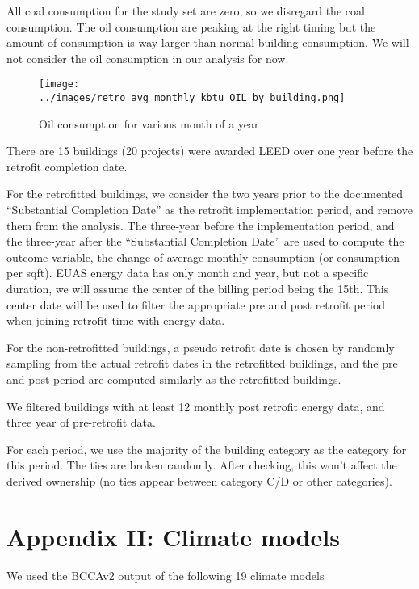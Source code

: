 \documentclass[12pt]{article}
\begin{document}
All coal consumption for the study set are zero, so we disregard the coal
consumption. The oil consumption are peaking at the right timing but the amount
of consumption is way larger than normal building consumption. We will not
consider the oil consumption in our analysis for now.

\begin{figure}[H]
  \centering
  \texttt{[image: ../images/retro\_avg\_monthly\_kbtu\_OIL\_by\_building.png]}
  \caption[Oil consumption trend]{Oil consumption for various month of a year}
  \label{fig:retro_avg_monthly_kbtu_OIL_by_building}
\end{figure}

There are 15 buildings (20 projects) were awarded LEED over one year before the
retrofit completion date.

For the retrofitted buildings, we consider the two years prior to the documented
``Substantial Completion Date'' as the retrofit implementation period, and
remove them from the analysis. The three-year before the implementation period,
and the three-year after the ``Substantial Completion Date'' are used to compute
the outcome variable, the change of average monthly consumption (or consumption
per sqft). EUAS energy data has only month and year, but not a specific
duration, we will assume the center of the billing period being the 15th. This
center date will be used to filter the appropriate pre and post retrofit period
when joining retrofit time with energy data.

For the non-retrofitted buildings, a pseudo retrofit date is chosen by randomly
sampling from the actual retrofit dates in the retrofitted buildings, and the pre
and post period are computed similarly as the retrofitted buildings.

We filtered buildings with at least 12 monthly post retrofit energy data, and
three year of pre-retrofit data.

For each period, we use the majority of the building category as the category
for this period. The ties are broken randomly. After checking, this won't affect
the derived ownership (no ties appear between category C/D or other categories).
\section{Appendix II: Climate models}
We used the BCCAv2 output of the following 19 climate models
\end{document}
